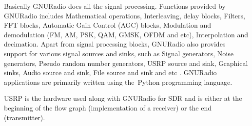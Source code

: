 Basically GNURadio does all the signal processing. Functions provided by 
GNURadio includes Mathematical operations, Interleaving, delay blocks, 
Filters, FFT blocks, Automatic Gain Control (AGC) blocks, Modulation and 
demodulation (FM, AM, PSK, QAM, GMSK, OFDM and etc), Interpolation and 
decimation. Apart from signal processing blocks, GNURadio also provides 
support for various signal sources and sinks, such as Signal generators, Noise
generators, Pseudo random number generators, USRP source and sink, Graphical 
sinks, Audio source and sink, File source and sink and etc \cite{wikiGNURadio}.
GNURadio applications are primarily written using the Python programming 
language.

USRP is the hardware used along with GNURadio for SDR and is either at the 
beginning of the flow graph (implementation of a receiver) or the end 
(transmitter).




